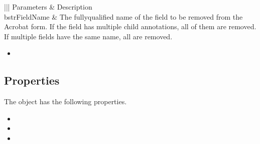 \documentclass[letterpaper,12pt,english,openany,oneside]{sphinxmanual}
\begin{document}
\begin{savenotes}\sphinxattablestart
\centering
{}\label{\detokenize{IAC_API_FormsIntro:section-18}}\nobreak
\begin{tabular}[t]{|||}
\hline
\sphinxstyletheadfamily 
Parameters
&\sphinxstyletheadfamily 
Description
\\
\hline
bstrFieldName
&
The fully\sphinxhyphen{}qualified name of the field to be removed from the Acrobat form. If the field has multiple child annotations, all of them are removed. If multiple fields have the same name, all are removed.
\\
\hline
\end{tabular}
\par
\sphinxattableend\end{savenotes}
\label{\detokenize{IAC_API_FormsIntro:related-methods-13}}
\begin{itemize}
\item {} 

\end{itemize}
\label{\detokenize{IAC_API_FormsIntro:example-26}}

\begin{sphinxVerbatim}[commandchars=\\\{\}]
\end{sphinxVerbatim}


\subsection{Properties}
\label{\detokenize{IAC_API_FormsIntro:properties-1}}\label{\detokenize{IAC_API_FormsIntro:id2}}
The  object has the following properties.
\begin{itemize}
\item {} 

\item {} 

\item {} 

\end{itemize}
\end{document}
